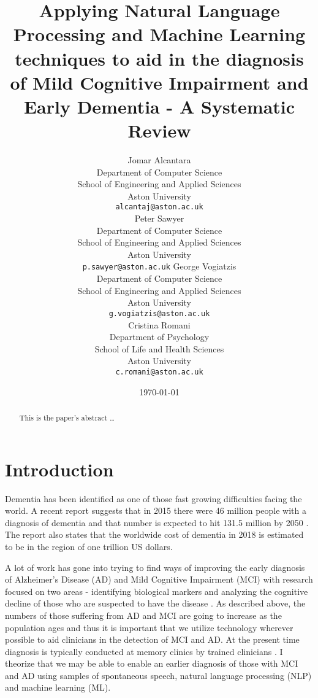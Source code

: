 \documentclass[12pt]{article}
\title{Applying Natural Language Processing and Machine Learning techniques to aid in the diagnosis of Mild Cognitive Impairment and Early Dementia - A Systematic Review}
\author{
	Jomar Alcantara \\
	Department of Computer Science\\
	School of Engineering and Applied Sciences\\
	Aston University\\
	\texttt{alcantaj@aston.ac.uk} \\
		\AND
	Peter Sawyer \\
	Department of Computer Science\\
	School of Engineering and Applied Sciences\\
	Aston University\\
	\texttt{p.sawyer@aston.ac.uk}
		\AND
	George Vogiatzis\\
	Department of Computer Science\\
	School of Engineering and Applied Sciences\\
	Aston University \\
	\texttt{g.vogiatzis@aston.ac.uk} \\
		\AND
	Cristina Romani\\
	Department of Psychology\\
	School of Life and Health Sciences\\
	Aston University \\
	\texttt{c.romani@aston.ac.uk}
}
\date{\today}
\begin{document}
\maketitle

\bigskip
\begin{abstract}
This is the paper's abstract \ldots
\end{abstract}

\section{Introduction}
Dementia has been identified as one of those fast growing difficulties facing the world. A recent report suggests that in 2015 there were 46 million people with a diagnosis of dementia and that number is expected to hit 131.5 million by 2050 \cite{Prince2015}. The report also states that the worldwide cost of dementia in 2018 is estimated to be in the region of one trillion US dollars.
\par
A lot of work has gone into trying to find ways of improving the early diagnosis of Alzheimer's Disease (AD) and Mild Cognitive Impairment (MCI) with research focused on two areas - identifying biological markers and analyzing the cognitive decline of those who are suspected to have the disease \cite{Taler2008}. As described above, the numbers of those suffering from AD and MCI are going to increase as the population ages \cite{Prince2015} and thus it is important that we utilize technology wherever possible to aid clinicians in the detection of MCI and AD. At the present time diagnosis is typically conducted at memory clinics by trained clinicians \cite{Boschi2017}. I theorize that we may be able to enable an earlier diagnosis of those with MCI and AD using samples of spontaneous speech, natural language processing (NLP) and machine learning (ML).
\par
\end{document}

